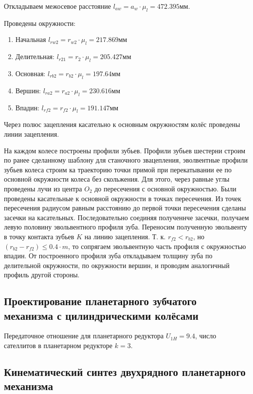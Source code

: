 Откладываем межосевое расстояние $l_{aw} = a_w \cdot \mu_l = 472.395 мм$. 

Проведены окружности:

\begin{enumerate}
	\item Начальная $l_{rw2} = r_{w2} \cdot \mu_l = 217.869 мм$
	\item Делительная: $l_{r21} = r_2 \cdot \mu_l = 205.427 мм$
	\item Основная: $l_{rb2} = r_{b2} \cdot \mu_l = 197.64 мм$
	\item Вершин: $l_{ra2} = r_{a2} \cdot \mu_l = 230.616 мм$
	\item Впадин: $l_{rf2} = r_{f2} \cdot \mu_l = 191.147 мм$
\end{enumerate}

Через полюс зацепления касательно к основным окружностям колёс проведены линии зацепления.

На каждом колесе построены профили зубьев. Профили зубьев шестерни строим по ранее сделанному шаблону для станочного звацепления, эволвентные профили зубьев колеса строим ка траекторию точки примой при перекатывании ее по основной окружности колеса без скольжения. Для этого, через равные углы проведены лучи из центра $O_2$ до пересечения с основной окружностью. Были проведены касательные к основной окружности в точках пересечения. Из точек пересечения радиусом равным расстоянию до первой точки пересечения сделаны засечки на касательных. Последовательно соединяя полученнче засечки, получаем левую половину эвольвентного профиля зуба. Переносим полученную эвольвенту в точку контакта зубьев $K$ на линию зацепления. Т. к. $r_{f2} < r_{b2}$, но $ (r_{b2} - r_{f2}) \leqslant 0.4 \cdot m $, то сопрягаем эвольвентную часть профиля с окружностью впадин. От построенного профиля зуба откладываем толщину зуба по делительной окружности, по окружности вершин, и проводим аналогичный профиль другой стороны.

\subsection{Проектирование планетарного зубчатого механизма с цилиндрическими колёсами}

Передаточное отношение для планетарного редуктора $U_{1H} = 9.4$, число сателлитов в планетарном редукторе $k = 3$.


\subsection{Кинематический синтез двухрядного планетарного механизма}

